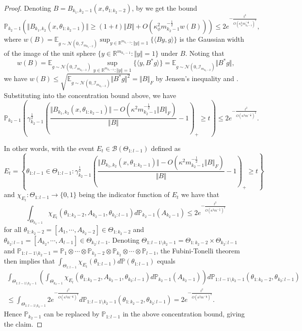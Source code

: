 \documentclass[twoside,11pt]{article}
\newcommand{\R}{\mathbb{R}}
\newcommand{\E}{\mathbb{E}}
\newcommand{\Prob}{\mathbb{P}}
\newcommand{\Id}{\mathcal{I}}
\begin{document}
\begin{proof}
Denoting $B = B_{k_1, k_2-1}(x, \theta_{1 : k_2-2})$, by \citet[Exercise~9.1.8]{Vershynin2018} we get the bound
\[
\Prob_{k_2-1}\left(
\Vert B_{k_1, k_2}(x, \theta_{1 : k_2-1}) \Vert \geq (1+t) \Vert B \Vert + O(\kappa_\phi^2 m_{k_2-1}^{-\frac{1}{2}} w(B))
\right)
\leq 2e^{-\frac{t^2}{O(\kappa_\phi^2 m_{k_2-1}^{-\frac{1}{2}})^2}},
\]
where $w(B) = \E_{g \sim \mathcal{N}(0,\Id_{m_{k_2-2}})} \sup_{y \in \R^{m_{k_1-1}} : \Vert y \Vert = 1}\{ \langle B y, g \rangle \}$ is the Gaussian width of the image of the unit sphere $\{ y \in \R^{m_{k_1-1}} : \Vert y \Vert = 1 \}$ under $B$. Noting that
\[
w(B) = \E_{g \sim \mathcal{N}\left( 0, \Id_{m_{k_2-2}} \right)} \sup_{y \in \R^{m_{k_1-1}} : \Vert y \Vert = 1}\{ \langle y, B^* g \rangle \} = \E_{g \sim \mathcal{N}\left( 0, \Id_{m_{k_2-2}} \right)} \Vert B^* g \Vert,
\]
we have $w(B) \leq \sqrt{\E_{g \sim \mathcal{N}(0,\Id_{m_{k_2-2}})} \Vert B^* g \Vert^2} = \Vert B \Vert_F$ by Jensen's inequality and \citet[Exercise~6.3.1]{Vershynin2018}. Substituting into the concentration bound above, we have
\[
\Prob_{k_2-1}\left(
\gamma_{k_2-1}^{\frac{1}{2}} \left( \frac{\Vert B_{k_1, k_2}(x, \theta_{1 : k_2-1}) \Vert - O(\kappa^2 m_{k_2-1}^{-\frac{1}{2}} \Vert B \Vert_F)}{\Vert B \Vert} - 1 \right)_+ \geq t
\right)
\leq 2e^{-\frac{t^2}{O(\kappa^2 m^{-\frac{1}{2}})^2}}.
\]

In other words, with the event $E_t \in \mathcal{B}(\Theta_{1:l-1})$ defined as
\[
E_t = \left\{ \theta_{1:l-1} \in \Theta_{1:l-1} : \gamma_{k_2-1}^{\frac{1}{2}} \left( \frac{\Vert B_{k_1, k_2}(x, \theta_{1 : k_2-1}) \Vert - O(\kappa^2 m_{k_2-1}^{-\frac{1}{2}} \Vert B \Vert_F)}{\Vert B \Vert} - 1 \right)_+ \geq t \right\}
\]
and $\chi_{E_t} : \Theta_{1:l-1} \to \{0,1\}$ being the indicator function of $E_t$ we have that
\[
\int_{\Theta_{k_2-1}} \chi_{E_t}(\theta_{1:k_2-2},A_{k_2-1},\theta_{k_2:l-1}) d\Prob_{k_2-1}(A_{k_2-1}) \leq 2e^{-\frac{t^2}{O(\kappa^2 m^{-\frac{1}{2}})^2}}
\]
for all $\theta_{1:k_2-2} = [A_1,\cdots,A_{k_2-2}] \in \Theta_{1:k_2-2}$ and $\theta_{k_2:l-1} = [A_{k_2},\cdots,A_{l-1}] \in \Theta_{k_2:l-1}$. Denoting $\Theta_{1:l-1 \setminus k_2-1} = \Theta_{1:k_2-2} \times \Theta_{k_2:l-1}$ and $\Prob_{1:l-1 \setminus k_2-1} = \Prob_1 \otimes \cdots \otimes \Prob_{k_2-2} \otimes \Prob_{k_2} \otimes \cdots \otimes \Prob_{l-1}$, the Fubini-Tonelli theorem then implies that $\int_{\Theta_{1:l-1}} \chi_{E_t}(\theta_{1:l-1}) d\Prob(\theta_{1:l-1})$ equals
\begin{multline*}
\int_{\Theta_{1:l-1 \setminus k_2-1}} \left( \int_{\Theta_{k_2-1}} \chi_{E_t}(\theta_{1:k_2-2},A_{k_2-1},\theta_{k_2:l-1}) d\Prob_{k_2-1}(A_{k_2-1}) \right) d\Prob_{1:l-1 \setminus k_2-1}(\theta_{1:k_2-2}, \theta_{k_2:l-1}) \\
\leq \int_{\Theta_{1:l-1 \setminus k_2-1}} 2e^{-\frac{t^2}{O(\kappa^2 m^{-\frac{1}{2}})^2}} d\Prob_{1:l-1 \setminus k_2-1}(\theta_{1:k_2-2}, \theta_{k_2:l-1})
= 2e^{-\frac{t^2}{O(\kappa^2 m^{-\frac{1}{2}})^2}}.
\end{multline*}
Hence $\Prob_{k_2-1}$ can be replaced by $\Prob_{1:l-1}$ in the above concentration bound, giving the claim.
\end{proof}
\end{document}
